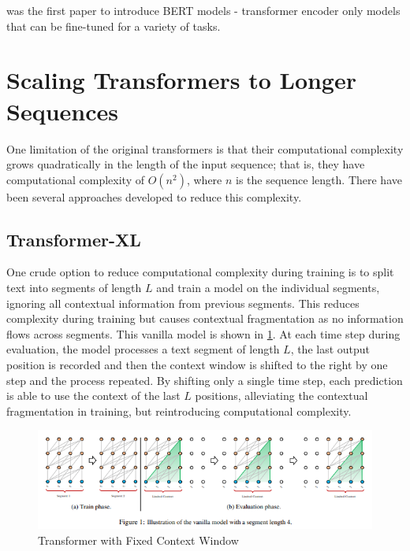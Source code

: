 \documentclass[11pt]{article}
\theoremstyle{definition}
\begin{document}
\cite{devlin2019bert} was the first paper to introduce BERT models - transformer encoder only models that can be fine-tuned for a variety of tasks.

\section{Scaling Transformers to Longer Sequences}

One limitation of the original transformers is that their computational complexity grows quadratically in the length of the input sequence; that is, they have computational complexity of $O(n^2)$, where $n$ is the sequence length. There have been several approaches developed to reduce this complexity.

\subsection{Transformer-XL \cite{dai2019transformerxl}}

One crude option to reduce computational complexity during training is to split text into segments of length $L$ and train a model on the individual segments, ignoring all contextual information from previous segments. This reduces complexity during training but causes contextual fragmentation as no information flows across segments. This vanilla model is shown in \ref{fig:transformerxl-vanilla}. At each time step during evaluation, the model processes a text segment of length $L$, the last output position is recorded and then the context window is shifted to the right by one step and the process repeated. By shifting only a single time step, each prediction is able to use the context of the last $L$ positions, alleviating the contextual fragmentation in training, but reintroducing computational complexity. 

\begin{figure}
\centering
  \includegraphics[width=\textwidth,height=\textheight,keepaspectratio]{transformers/transformerXL_vanilla.png}
  \caption{Transformer with Fixed Context Window \cite{dai2019transformerxl}}
  \label{fig:transformerxl-vanilla}
\end{figure}
\end{document}
